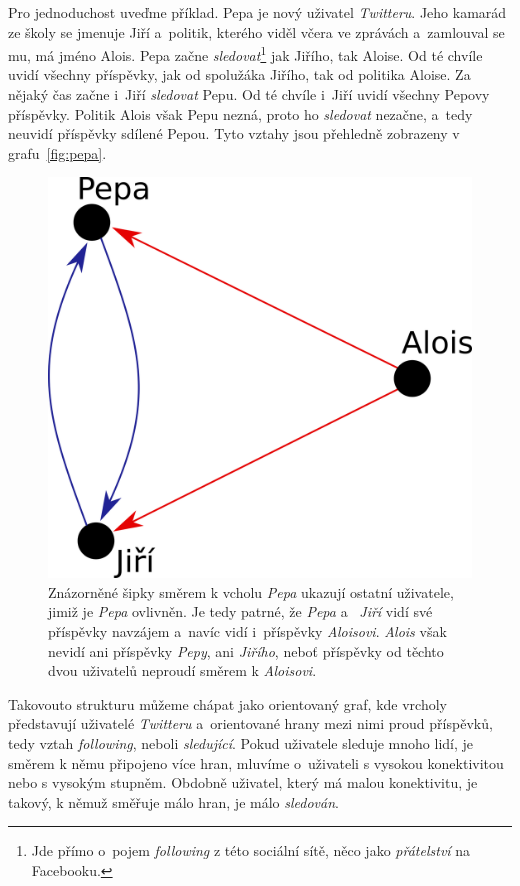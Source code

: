 \documentclass[12pt, a4paper]{article}
\numberwithin{equation}{section} 	%
\begin{document}
Pro jednoduchost uveďme příklad. Pepa je nový uživatel \textit{Twitteru}. Jeho kamarád ze školy se jmenuje Jiří a~politik, kterého viděl včera ve zprávách a~zamlouval se mu, má jméno Alois. Pepa začne \textit{sledovat}\footnote{Jde přímo o~pojem \textit{following} z této sociální sítě, něco jako \textit{přátelství} na Facebooku.} jak Jiřího, tak Aloise. Od té chvíle uvidí všechny příspěvky, jak od spolužáka Jiřího, tak od politika Aloise. Za nějaký čas začne i~Jiří \textit{sledovat} Pepu. Od té chvíle i~Jiří uvidí všechny Pepovy příspěvky. Politik Alois však Pepu nezná, proto ho \textit{sledovat} nezačne, a~tedy neuvidí příspěvky sdílené Pepou. Tyto vztahy jsou přehledně zobrazeny v grafu~\autoref{fig:pepa}.
\begin{figure}[h]
\centering
\includegraphics[scale=0.35]{./Pics/pepa.png}
    \caption{Znázorněné šipky směrem k vcholu \textit{Pepa} ukazují ostatní uživatele, jimiž je \textit{Pepa} ovlivněn. Je tedy patrné, že \textit{Pepa} a~      \textit{Jiří} vidí své příspěvky navzájem a~navíc vidí i~příspěvky \textit{Aloisovi}. \textit{Alois} však nevidí ani příspěvky \textit{Pepy}, ani \textit{Jiřího}, neboť příspěvky od těchto dvou uživatelů neproudí směrem k \textit{Aloisovi}.}
\label{fig:pepa}
\end{figure}

Takovouto strukturu můžeme chápat jako orientovaný graf, kde vrcholy před\-sta\-vu\-jí uživatelé \textit{Twitteru} a~orientované hrany mezi nimi proud příspěvků, tedy vztah \textit{following}, neboli \textit{sledující}. Pokud uživatele sleduje mnoho lidí, je směrem k němu připojeno více hran, mluvíme o~uživateli s vysokou konektivitou nebo s vysokým stupněm. Obdobně uživatel, který má malou konektivitu, je takový, k němuž směřuje málo hran, je málo \textit{sledován}.
\end{document}
